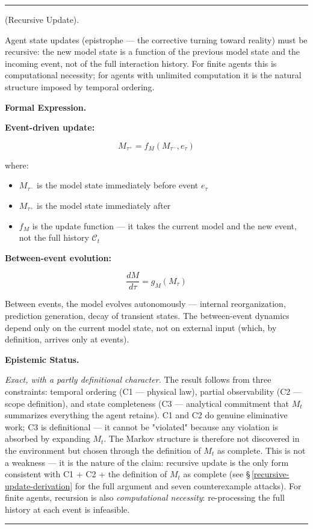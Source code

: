 \documentclass[11pt,oneside]{article}
\newcounter{claim}[section]
\renewcommand{\theclaim}{\thesection.\arabic{claim}}
\newenvironment{segment}[2]{%
  \refstepcounter{claim}%
  \bigskip\noindent\hrule\smallskip
  \noindent{\bfseries #1~\theclaim}\enskip(#2).\par\smallskip
  \noindent\ignorespaces
}{%
  \par\smallskip\noindent\hrule\bigskip
}
\newenvironment{proposition}[1][]{\begin{segment}{Proposition}{#1}}{\end{segment}}
\begin{document}
\begin{proposition}[Recursive Update]
\label{recursive-update}
Agent state updates (epistrophe — the corrective turning toward reality) must be recursive: the new model state is a function of the previous model state and the incoming event, not of the full interaction history. For finite agents this is computational necessity; for agents with unlimited computation it is the natural structure imposed by temporal ordering.



\medskip\noindent\textbf{Formal Expression.}



\textbf{Event-driven update:}

$$M_{\tau^+} = f_M(M_{\tau^-}, e_\tau)$$

where:
\begin{itemize}
  \item $M_{\tau^-}$ is the model state immediately before event $e_\tau$
  \item $M_{\tau^+}$ is the model state immediately after
  \item $f_M$ is the update function — it takes the current model and the new event, not the full history $\mathcal C_t$
\end{itemize}


\textbf{Between-event evolution:}

$$\frac{dM}{d\tau} = g_M(M_\tau)$$

Between events, the model evolves autonomously — internal reorganization, prediction generation, decay of transient states. The between-event dynamics depend only on the current model state, not on external input (which, by definition, arrives only at events).


\medskip\noindent\textbf{Epistemic Status.}


\textit{Exact, with a partly definitional character.} The result follows from three constraints: temporal ordering (C1 — physical law), partial observability (C2 — scope definition), and state completeness (C3 — analytical commitment that $M_t$ summarizes everything the agent retains). C1 and C2 do genuine eliminative work; C3 is definitional — it cannot be "violated" because any violation is absorbed by expanding $M_t$. The Markov structure is therefore not discovered in the environment but chosen through the definition of $M_t$ as complete. This is not a weakness — it is the nature of the claim: recursive update is the only form consistent with C1 + C2 + the definition of $M_t$ as complete (see \S\,\ref{recursive-update-derivation} for the full argument and seven counterexample attacks). For finite agents, recursion is also \textit{computational necessity}: re-processing the full history at each event is infeasible.



\end{proposition}
\end{document}
